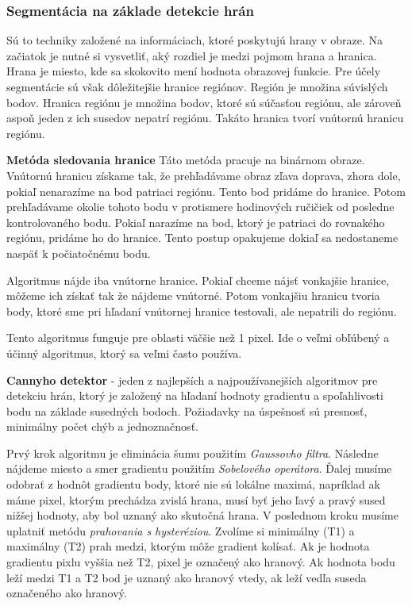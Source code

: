 \subsubsection{Segmentácia na základe detekcie hrán}
Sú to techniky založené na informáciach, ktoré poskytujú hrany v obraze. Na začiatok je nutné si vysvetliť, aký rozdiel je medzi pojmom hrana a hranica. Hrana je miesto, kde sa skokovito mení hodnota obrazovej funkcie. Pre účely segmentácie sú však dôležitejšie hranice regiónov. Región je množina súvislých bodov. Hranica regiónu je množina bodov, ktoré sú súčasťou regiónu, ale zároveň aspoň jeden z ich susedov nepatrí regiónu. Takáto hranica tvorí vnútornú hranicu regiónu. \cite{pocitacove_videnie_v_praxi} 

\textbf{Metóda sledovania hranice}
\label{sec:follow_border}
Táto metóda pracuje na binárnom obraze. Vnútornú hranicu získame tak, že prehľadávame obraz zľava doprava, zhora dole, pokiaľ nenarazíme na bod patriaci regiónu. Tento bod pridáme do hranice. Potom prehľadávame okolie tohoto bodu v protismere hodinových ručičiek od posledne kontrolovaného bodu. Pokiaľ narazíme na bod, ktorý je patriaci do rovnakého regiónu, pridáme ho do hranice. Tento postup opakujeme dokiaľ sa nedostaneme naspäť k počiatočnému bodu. \cite{pocitacove_videnie_v_praxi} 

Algoritmus nájde iba vnútorne hranice. Pokiaľ chceme nájsť vonkajšie hranice, môžeme ich získať tak že nájdeme vnútorné. Potom vonkajšiu hranicu tvoria body, ktoré sme pri hľadaní vnútornej hranice testovali, ale nepatrili do regiónu. 

Tento algoritmus funguje pre oblasti väčšie než 1 pixel. Ide o veľmi obľúbený a účinný algoritmus, ktorý sa veľmi často používa.

\textbf{Cannyho detektor} \cite{cannyho_detektor} - jeden z najlepších a najpoužívanejších algoritmov pre detekciu hrán, ktorý je založený na hľadaní hodnoty gradientu a spoľahlivosti bodu na základe susedných bodoch. Požiadavky na úspešnosť sú presnosť, minimálny počet chýb a jednoznačnosť. 

Prvý krok algoritmu je eliminácia šumu použitím \textit{Gaussovho filtra}. Následne nájdeme miesto a smer gradientu použitím \textit{Sobelového operátora}. Ďalej musíme odobrať z hodnôt gradientu  body, ktoré nie sú lokálne maximá, napríklad ak máme pixel, ktorým prechádza zvislá hrana, musí byť jeho ľavý a pravý sused nižšej hodnoty, aby bol uznaný  ako skutočná hrana. V poslednom kroku musíme uplatniť metódu \textit{prahovania s hysteréziou}. Zvolíme si minimálny (T1) a maximálny (T2) prah medzi, ktorým môže gradient kolísať.  Ak je hodnota gradientu pixlu vyššia než T2, pixel je označený ako hranový. Ak hodnota bodu leží medzi T1 a T2 bod je uznaný ako hranový vtedy, ak leží vedľa suseda označeného ako hranový. \cite{cannyho_detektor}


